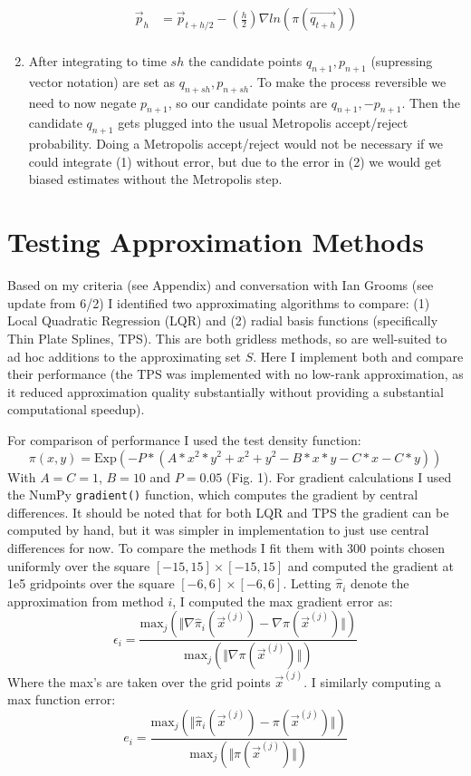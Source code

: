 \documentclass[12pt,a4paper]{article}
\begin{document}
\begin{enumerate}
\begin{equation}
\begin{split}
\vec{p}_h &= \vec{p}_{t+h/2} - (\frac{h}{2})  \nabla ln(\pi(\vec{q_{t+h}})) \\
\end{split}
\end{equation}
\item After integrating to time $sh$ the candidate points $q_{n+1}, p_{n+1}$ (supressing vector notation) are set as $q_{n+sh}, p_{n+sh}$.  To make the process reversible we need to now negate $p_{n+1}$, so our candidate points are $q_{n+1}, -p_{n+1}$.  Then the candidate $q_{n+1}$ gets plugged into the usual Metropolis accept/reject probability.  Doing a Metropolis accept/reject would not be necessary if we could integrate (1) without error, but due to the error in (2) we would get biased estimates without the Metropolis step.
\end{enumerate}

\section{Testing Approximation Methods}
Based on my criteria (see Appendix) and conversation with Ian Grooms (see update from 6/2) I identified two approximating algorithms to compare: (1) Local Quadratic Regression (LQR) and (2) radial basis functions (specifically Thin Plate Splines, TPS).  This are both gridless methods, so are well-suited to ad hoc additions to the approximating set $S$.  Here I implement both and compare their performance (the TPS was implemented with no low-rank approximation, as it reduced approximation quality substantially without providing a substantial computational speedup).

For comparison of performance I used the test density function:
\begin{equation}
\pi(x,y) = \text{Exp} \left( -P*(A*x^2*y^2 + x^2 + y^2 - B*x*y - C*x - C*y) \right)
\end{equation}
With $A = C = 1$, $ B =10$ and $ P = 0.05$ (Fig. 1).  For gradient calculations I used the NumPy \texttt{gradient()} function, which computes the gradient by central differences.  It should be noted that for both LQR and TPS the gradient can be computed by hand, but it was simpler in implementation to just use central differences for now.  To compare the methods I fit them with 300 points chosen uniformly over the square $[-15,15] \times [-15,15]$ and computed the gradient at 1e5 gridpoints over the square $[-6,6] \times [-6,6]$.  Letting $\hat{\pi}_i$ denote the approximation from method $i$, I computed the max gradient error as:
\[
\epsilon_i = \frac{ \text{max}_{j} \left( \Vert \nabla \hat{\pi}_i(\vec{x}^{(j)}) - \nabla \pi(\vec{x}^{(j)})  \Vert \right) } { \text{max}_j \left( \Vert \nabla \pi(\vec{x}^{(j)}) \Vert \right) }
\]
Where the max's are taken over the grid points $\vec{x}^{(j)}$. I similarly computing a max function error:
\[
e_i = \frac{ \text{max}_{j} \left( \Vert \hat{\pi}_i(\vec{x}^{(j)}) - \pi(\vec{x}^{(j)})  \Vert \right) } { \text{max}_j \left( \Vert \pi(\vec{x}^{(j)}) \Vert \right) }
\]
\end{document}

